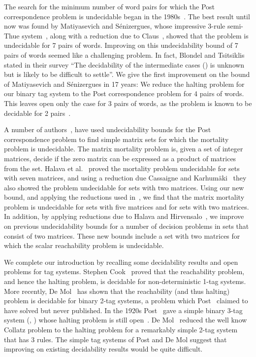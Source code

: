 \documentclass[11pt]{article} \usepackage{amsfonts,amsmath,amssymb,amsthm}
\begin{document}
 
The search for the minimum number of word pairs for which the Post correspondence problem is undecidable began in the 1980s~\cite{Claus1980,Pansiot1981}. 
The best result until now was found by Matiyasevich and S\'{e}nizergues, whose impressive 3-rule semi-Thue system~\cite{Matiyasevich1996,Matiyasevich2005}, along with a reduction due to Claus~\cite{Claus1980}, showed that the problem is undecidable for 7 pairs of words. 
Improving on this undecidability bound of 7 pairs of words seemed like a challenging problem. In fact, Blondel and Tsitsiklis~\cite{Blondel2000} stated in their survey ``The decidability of the intermediate cases () is unknown but is likely to be difficult to settle''. We give the first improvement on the bound of Matiyasevich and S\'{e}nizergues in 17 years: We reduce the halting problem for our binary tag system to the Post correspondence problem for 4 pairs of words. This leaves open only the case for 3 pairs of words, as the problem is known to be decidable for 2 pairs~\cite{Ehrenfeucht1982,Halava2002A}. 


A number of authors~\cite{Blondel1997,Cassaigne1998,Halava2001,Halava2007,Paterson1970}, have used undecidability bounds for the Post correspondence problem to find simple matrix sets for which the mortality problem is undecidable. 
The matrix mortality problem is, given a set of  integer matrices, decide if the zero matrix can be expressed as a product of matrices from the set. Halava et al.~\cite{Halava2007} proved the mortality problem undecidable for sets with seven  matrices, and using a reduction due Cassaigne and Karhum\"{a}ki~\cite{Cassaigne1998} they also showed the problem undecidable for sets with two  matrices. 
Using our new bound, and applying the reductions used in~\cite{Cassaigne1998,Halava2001}, we find that the matrix mortality problem is undecidable for sets with five  matrices and for sets with two  matrices. In addition, by applying reductions due to Halava and Hirvensalo~\cite{Halava2007A}, we improve on previous undecidability bounds for a number of decision problems in sets that consist of two matrices. These new bounds include a set with two  matrices for which the scalar reachability problem is undecidable.


We complete our introduction by recalling some decidability results and open problems for tag systems.  
Stephen Cook~\cite{Cook1966} proved that the reachability problem, and hence the halting problem, is decidable for non-deterministic
1-tag systems. More recently, De Mol~\cite{DeMol2010} has shown that the reachability (and thus halting) problem is decidable for binary 2-tag systems, a problem which Post~\cite{Post1965} claimed to have solved but never published. In the 1920s Post~\cite{Post1965} gave a simple binary 3-tag system (, ) whose halting problem is still open~\cite{DeMol2011}. De Mol~\cite{DeMol2008} reduced the well know Collatz problem to the halting problem for a remarkably simple 2-tag system that has 3 rules. The simple tag systems of Post and De Mol suggest that improving on existing decidability results would be quite difficult. 
\end{document}

